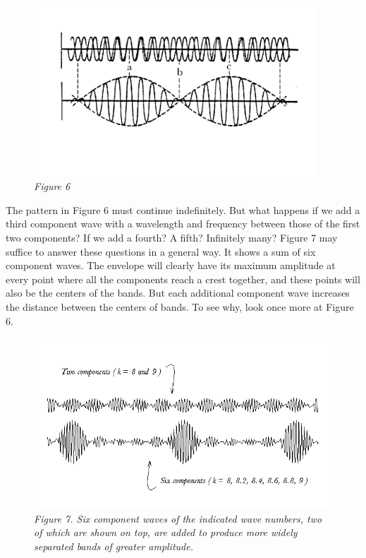 \begin{figure}[h] %
  \begin{center}
    \includegraphics[width=4.18333in,height=2.51667in]{images/08_debroglie/image039.png}
    \caption*{\emph{Figure 6}}
  \end{center}
\end{figure}

The pattern in Figure 6 must continue indefinitely. But what happens if
we add a third component wave with a wavelength and frequency between
those of the first two components? If we add a fourth? A fifth?
Infinitely many? Figure 7 may suffice to answer these questions in a
general way. It shows a sum of six component waves. The envelope will
clearly have its maximum amplitude at every point where all the
components reach a crest together, and these points will also be the
centers of the bands. But each additional component wave increases the
distance between the centers of bands. To see why, look once more at
Figure 6.

\begin{figure}[h] %
  \begin{center}
    \includegraphics[width=4.35334in,height=2.52in]{images/08_debroglie/image041.png}
    \caption*{\emph{Figure 7. Six component waves of the indicated wave numbers, two of
     which are shown on top, are added to produce more widely separated bands
     of greater amplitude.}}
  \end{center}
\end{figure}

